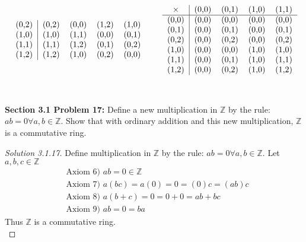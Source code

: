 \documentclass[12pt]{article}
\begin{document}
\begin{align*}
\begin{tabular}{c | c c c c }
			(0,2) & (0,2) & (0,0) & (1,2) & (1,0) \\
			(1,0) & (1,0) & (1,1) & (0,0) & (0,1) \\	
			(1,1) & (1,1) & (1,2) & (0,1) & (0,2) \\
			(1,2) & (1,2) & (1,0) & (0,2) & (0,0) \\	
		\end{tabular}	
		\qquad	
		\begin{tabular}{c | c c c c }
			\text{$\times$} & (0,0) & (0,1) & (1,0) & (1,1) \\
			\hline 
			(0,0) & (0,0) & (0,0) & (0,0) & (0,0) \\
			(0,1) & (0,0) & (0,1) & (0,0) & (0,1) \\
			(0,2) & (0,0) & (0,2) & (0,0) & (0,2) \\
			(1,0) & (0,0) & (0,0) & (1,0) & (1,0) \\	
			(1,1) & (0,0) & (0,1) & (1,0) & (1,1) \\
			(1,2) & (0,0) & (0,2) & (1,0) & (1,2) \\	
		\end{tabular}
	\end{align*}
\\ \\
\noindent \textbf{Section 3.1 Problem 17: }	Define a new multiplication in $\mathbb{Z}$ by the rule: $ab = 0 \forall a,b \in \mathbb{Z}$. Show that with ordinary addition and this new multiplication, $\mathbb{Z}$ is a commutative ring.

	\begin{proof}[Solution 3.1.17] 
		Define multiplication in $\mathbb{Z}$ by the rule: $ab = 0 \forall a,b \in \mathbb{Z}$. Let $a,b,c \in \mathbb{Z}$
		\\
		\begin{align*}
			&\text{Axiom 6) } ab = 0 \in \mathbb{Z} \\
			&\text{Axiom 7) } a(bc) = a(0) = 0 = (0)c = (ab)c \\
			&\text{Axiom 8) } a(b+c) = 0 = 0 + 0 = ab + bc \\
			&\text{Axiom 9) } ab = 0 = ba
		\end{align*}
		Thus $\mathbb{Z}$ is a commutative ring. \\
	\end{proof}
\end{document}

